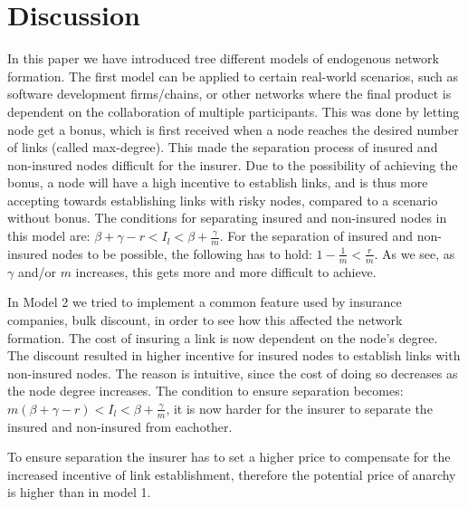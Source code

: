 \section{Discussion}
In this paper we have introduced tree different models of endogenous network formation. The first model can be applied to certain real-world scenarios, such as software development firms/chains, or other networks where the final product is dependent on the collaboration of multiple participants.
This was done by letting node get a bonus, which is first received when a node reaches the desired number of links (called max-degree). This made the separation process of insured and non-insured nodes difficult for the insurer. Due to the possibility of achieving the bonus, a node will have a high incentive to establish links, and is thus more accepting towards establishing links with risky nodes, compared to a scenario without bonus. The conditions for separating insured and non-insured nodes in this model are: $\beta+\gamma-r<I_{l}<\beta+\frac{\gamma}{m}$. For the separation of insured and non-insured nodes to be possible, the following has to hold: $1-\frac{1}{m}<\frac{r}{m}$. As we see, as $\gamma$ and/or $m$ increases, this gets more and more difficult to achieve. 

In Model 2 we tried to implement a common feature used by insurance companies, bulk discount, in order to see how this affected the network formation. The cost of insuring a link is now dependent on the node's degree. 
The discount resulted in higher incentive for insured nodes to establish links with non-insured nodes. The reason is intuitive, since the cost of doing so decreases as the node degree increases. 
The condition to ensure separation becomes: $m(\beta+\gamma-r)<I_{l}<\beta+\frac{\gamma}{m}$, it is now harder for the insurer to separate the insured and non-insured from eachother. 

To ensure separation the insurer has to set a higher price to compensate for the increased incentive of link establishment, therefore the potential price of anarchy is higher than in model 1.

